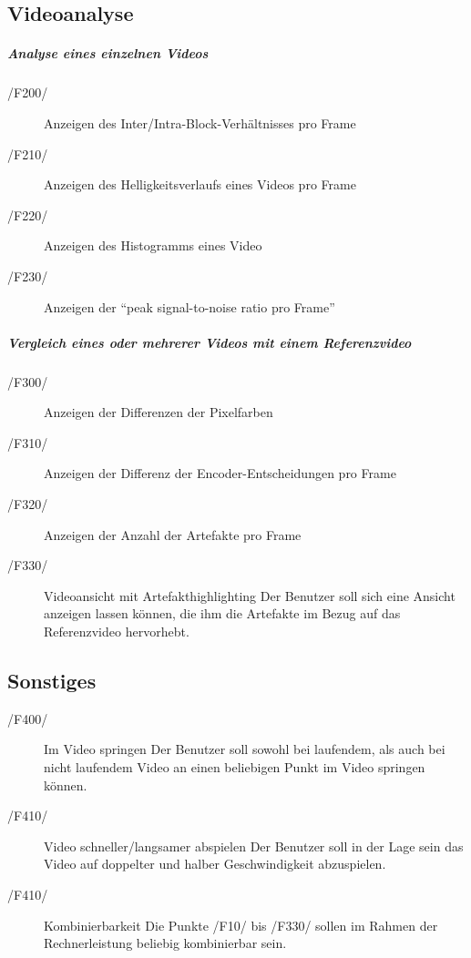 \subsection{Videoanalyse}
\subparagraph{Analyse eines einzelnen Videos} 
	\begin{description}
	        \item[/F200/]Anzeigen des Inter/Intra-Block-Verhältnisses pro Frame
                \item[/F210/]Anzeigen des Helligkeitsverlaufs eines Videos pro Frame
                \item[/F220/]Anzeigen des Histogramms eines Video
                \item[/F230/]Anzeigen der ``peak signal-to-noise ratio pro Frame''
        \end{description}
\subparagraph{Vergleich eines oder mehrerer Videos mit einem Referenzvideo}
        \begin{description}
   	        \item[/F300/]Anzeigen der Differenzen der Pixelfarben
                \item[/F310/]Anzeigen der Differenz der Encoder-Entscheidungen pro Frame
                \item[/F320/]Anzeigen der Anzahl der Artefakte pro Frame
                \item[/F330/]Videoansicht mit Artefakthighlighting \newline
			Der Benutzer soll sich eine Ansicht anzeigen lassen können, die ihm die Artefakte im Bezug auf das Referenzvideo hervorhebt.
        \end{description}  
\subsection{Sonstiges}
	\begin{description}
		\item[/F400/]Im Video springen \newline
			Der Benutzer soll sowohl bei laufendem, als auch bei nicht laufendem Video an einen beliebigen Punkt im Video springen können.
		\item[/F410/]Video schneller/langsamer abspielen \newline
			Der Benutzer soll in der Lage sein das Video auf doppelter und halber Geschwindigkeit abzuspielen.	
  		\item[/F410/]Kombinierbarkeit \newline
			Die Punkte /F10/ bis /F330/ sollen im Rahmen der Rechnerleistung beliebig kombinierbar sein.
        \end{description}

